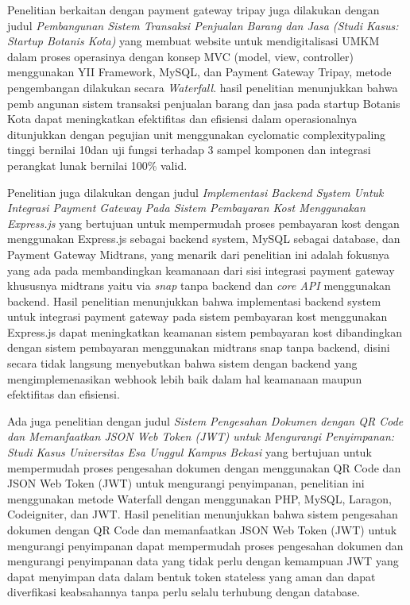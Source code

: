 Penelitian berkaitan dengan payment gateway tripay juga dilakukan \cite{Rachman_Rusdianto_Wihandika_2023} dengan judul \textit{Pembangunan Sistem Transaksi Penjualan Barang dan Jasa (Studi Kasus: Startup Botanis Kota)} yang membuat website untuk mendigitalisasi UMKM dalam proses operasinya dengan konsep MVC (model, view, controller) menggunakan YII Framework, MySQL, dan Payment Gateway Tripay, metode pengembangan dilakukan secara \textit{Waterfall}. hasil penelitian menunjukkan bahwa pemb
angunan sistem transaksi penjualan barang dan jasa pada startup Botanis Kota dapat meningkatkan efektifitas dan efisiensi dalam operasionalnya ditunjukkan dengan pegujian unit menggunakan cyclomatic complexitypaling tinggi bernilai 10dan uji fungsi terhadap 3 sampel komponen dan integrasi perangkat  lunak  bernilai  100\%  valid.

Penelitian \cite{Alma_Prihanto_2024} juga dilakukan dengan judul \textit{Implementasi Backend System Untuk Integrasi Payment Gateway Pada Sistem Pembayaran Kost Menggunakan Express.js} yang bertujuan untuk mempermudah proses pembayaran kost dengan menggunakan Express.js sebagai backend system, MySQL sebagai database, dan Payment Gateway Midtrans, yang menarik dari penelitian ini adalah fokusnya yang ada pada membandingkan keamanaan dari sisi integrasi payment gateway khususnya midtrans yaitu via \textit{snap} tanpa backend dan \textit{core API} menggunakan backend. Hasil penelitian menunjukkan bahwa implementasi backend system untuk integrasi payment gateway pada sistem pembayaran kost menggunakan Express.js dapat meningkatkan keamanan sistem pembayaran kost dibandingkan dengan sistem pembayaran menggunakan midtrans snap tanpa backend, disini secara tidak langsung menyebutkan bahwa sistem dengan backend yang mengimplemenasikan webhook lebih baik dalam hal keamanaan maupun efektifitas dan efisiensi.

Ada juga penelitian \cite{Rahman_Erzed_2024} dengan judul \textit{Sistem Pengesahan Dokumen dengan QR Code dan Memanfaatkan JSON Web Token (JWT) untuk Mengurangi Penyimpanan: Studi Kasus Universitas Esa Unggul Kampus Bekasi} yang bertujuan untuk mempermudah proses pengesahan dokumen dengan menggunakan QR Code dan JSON Web Token (JWT) untuk mengurangi penyimpanan, penelitian ini menggunakan metode Waterfall dengan menggunakan PHP, MySQL, Laragon, Codeigniter, dan JWT. Hasil penelitian menunjukkan bahwa sistem pengesahan dokumen dengan QR Code dan memanfaatkan JSON Web Token (JWT) untuk mengurangi penyimpanan dapat mempermudah proses pengesahan dokumen dan mengurangi penyimpanan data yang tidak perlu dengan kemampuan JWT yang dapat menyimpan data dalam bentuk token stateless yang aman dan dapat diverfikasi keabsahannya tanpa perlu selalu terhubung dengan database.

